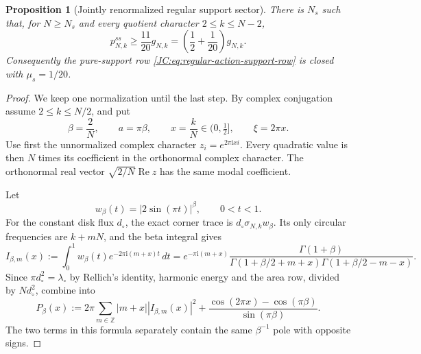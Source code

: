 \documentclass[11pt]{amsart}
\numberwithin{equation}{section}
\newtheorem{proposition}[theorem]{Proposition}
\theoremstyle{definition}
\theoremstyle{remark}
\begin{document}
\begin{proposition}[Jointly renormalized regular support sector]
\label{JC:prop:regular-support-renormalized}
There is $N_s$ such that, for $N\ge N_s$ and every quotient character
$2\le k\le N-2$,
\begin{equation}\label{JC:eq:regular-support-closed-gap}
 \boxed{
 p^{ss}_{N,k}\ge\frac{11}{20}g_{N,k}
 =\left(\frac12+\frac1{20}\right)g_{N,k}.}
\end{equation}
Consequently the pure-support row
\eqref{JC:eq:regular-action-support-row} is closed with
$\mu_s=1/20$.
\end{proposition}

\begin{proof}
We keep one normalization until the last step.  By complex conjugation
assume $2\le k\le N/2$, and put
\[
 \beta=\frac2N,\qquad a=\pi\beta,\qquad
 x=\frac{k}{N}\in(0,\tfrac12],\qquad \xi=2\pi x.
\]
Use first the unnormalized complex character
$z_i=e^{2\pi\mathrm i x i}$.
Every quadratic value is then $N$ times its coefficient in the
orthonormal complex character.  The orthonormal real vector
$\sqrt{2/N}\operatorname{Re}z$ has the same modal coefficient.

Let
\[
 w_\beta(t)=|2\sin(\pi t)|^\beta,\qquad0<t<1.
\]
For the constant disk flux $d_\circ$, the exact corner trace is
$d_\circ\sigma_{N,k}w_\beta$.  Its only circular frequencies are
$k+mN$, and the beta integral gives
\begin{equation}\label{JC:eq:corner-Gamma-coefficient}
 I_{\beta,m}(x):=\int_0^1w_\beta(t)e^{-2\pi\mathrm i(m+x)t}\,dt
 =
 e^{-\pi\mathrm i(m+x)}
 \frac{\Gamma(1+\beta)}
 {\Gamma(1+\beta/2+m+x)\Gamma(1+\beta/2-m-x)}.
\end{equation}
Since $\pi d_\circ^2=\lambda_\circ$ by Rellich's identity, harmonic
energy and the area row, divided by $Nd_\circ^2$, combine into
\begin{equation}\label{JC:eq:corner-joint-finite-N-symbol}
 P_\beta(x):=
 2\pi\sum_{m\in\mathbb Z}|m+x||I_{\beta,m}(x)|^2
 +\frac{\cos(2\pi x)-\cos(\pi\beta)}{\sin(\pi\beta)}.
\end{equation}
The two terms in this formula separately contain the same
$\beta^{-1}$ pole with opposite signs.


\end{proof}
\end{document}

